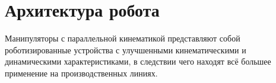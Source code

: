 \newpage

\section{Архитектура робота}

Манипуляторы с параллельной кинематикой представляют собой роботизированные устройства с улучшенными кинематическими и динамическими характеристиками, в следствии чего находят всё большее применение на производственных линиях.